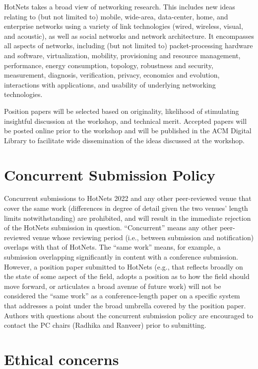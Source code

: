 \documentclass{hotnets22}
\begin{document}
HotNets takes a broad view of networking research. This includes new ideas relating to (but not limited to) mobile, wide-area, data-center, home, and enterprise networks using a variety of link technologies (wired, wireless, visual, and acoustic), as well as social networks and network architecture. It encompasses all aspects of networks, including (but not limited to) packet-processing hardware and software, virtualization, mobility, provisioning and resource management, performance, energy consumption, topology, robustness and security, measurement, diagnosis, verification, privacy, economics and evolution, interactions with applications, and usability of underlying networking technologies.

Position papers will be selected based on originality, likelihood of stimulating insightful discussion at the workshop, and technical merit. Accepted papers will be posted online prior to the workshop and will be published in the ACM Digital Library to facilitate wide dissemination of the ideas discussed at the workshop.


\section{Concurrent Submission Policy}

Concurrent submissions to HotNets 2022 and any other peer-reviewed venue that cover the same work (differences in degree of detail given the two venues' length limits notwithstanding) are prohibited, and will result in the immediate rejection of the HotNets submission in question. ``Concurrent'' means any other peer-reviewed venue whose reviewing period (i.e., between submission and notification) overlaps with that of HotNets. The ``same work'' means, for example, a submission overlapping significantly in content with a conference submission. However, a position paper submitted to HotNets (e.g., that reflects broadly on the state of some aspect of the field, adopts a position as to how the field should move forward, or articulates a broad avenue of future work) will not be considered the ``same work'' as a conference-length paper on a specific system that addresses a point under the broad umbrella covered by the position paper. Authors with questions about the concurrent submission policy are encouraged to contact the PC chairs (Radhika and Ranveer) prior to submitting.

\section{Ethical concerns}
\end{document}
